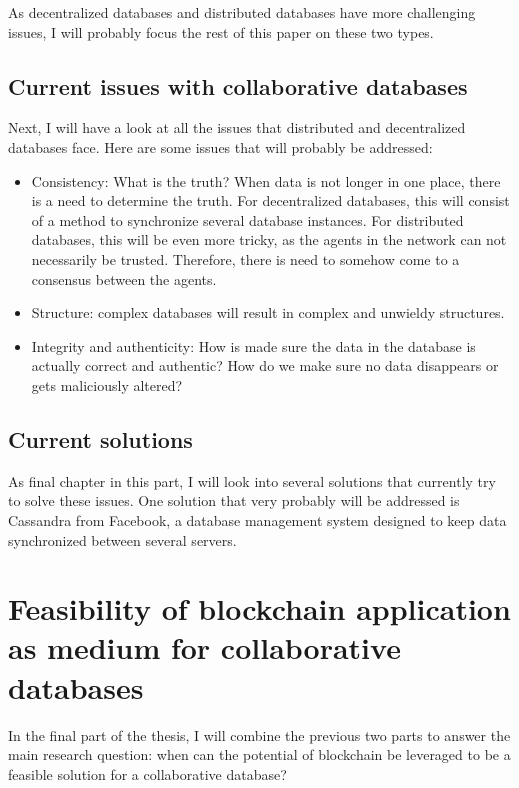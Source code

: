 \documentclass[11pt,a4paper]{article}
\begin{document}
As decentralized databases and distributed databases have more challenging issues, I will probably focus the rest of this paper on these two types.

\subsection{Current issues with collaborative databases}

Next, I will have a look at all the issues that distributed and decentralized databases face. Here are some issues that will probably be addressed:

\begin{itemize}
  \item Consistency: What is the truth? When data is not longer in one place, there is a need to determine the truth. For decentralized databases, this will consist of a method to synchronize several database instances. For distributed databases, this will be even more tricky, as the agents in the network can not necessarily be trusted. Therefore, there is need to somehow come to a consensus between the agents.
  \item Structure: complex databases will result in complex and unwieldy structures.
  \item Integrity and authenticity: How is made sure the data in the database is actually correct and authentic? How do we make sure no data disappears or gets maliciously altered?
\end{itemize}

\subsection{Current solutions}

As final chapter in this part, I will look into several solutions that currently try to solve these issues. One solution that very probably will be addressed is Cassandra from Facebook, a database management system designed to keep data synchronized between several servers.

\pagebreak

\section{Feasibility of blockchain application as medium for collaborative databases}
In the final part of the thesis, I will combine the previous two parts to answer the main research question: when can the potential of blockchain be leveraged to be a feasible solution for a collaborative database?
\end{document}
